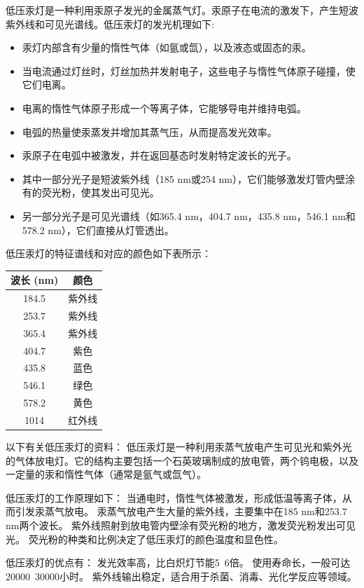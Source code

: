 \documentclass[dvipsnames, svgnames,a4paper,11pt]{article}
\begin{document}
	低压汞灯是一种利用汞原子发光的金属蒸气灯。汞原子在电流的激发下，产生短波紫外线和可见光谱线。低压汞灯的发光机理如下:
	
	\begin{itemize}
		\item 汞灯内部含有少量的惰性气体（如氩或氙），以及液态或固态的汞。
		\item 当电流通过灯丝时，灯丝加热并发射电子，这些电子与惰性气体原子碰撞，使它们电离。
		\item 电离的惰性气体原子形成一个等离子体，它能够导电并维持电弧。
		\item 电弧的热量使汞蒸发并增加其蒸气压，从而提高发光效率。
		\item 汞原子在电弧中被激发，并在返回基态时发射特定波长的光子。
		\item 其中一部分光子是短波紫外线（185 nm或254 nm），它们能够激发灯管内壁涂有的荧光粉，使其发出可见光。
		\item 另一部分光子是可见光谱线（如365.4 nm，404.7 nm，435.8 nm，546.1 nm和578.2 nm），它们直接从灯管透出。
	\end{itemize}
	
	低压汞灯的特征谱线和对应的颜色如下表所示：
	
	\begin{center}
		\begin{tabular}{|c|c|}
			\hline
			波长 (nm) & 颜色 \\
			\hline
			184.5 & 紫外线 \\
			253.7 & 紫外线 \\
			365.4 & 紫外线 \\
			404.7 & 紫色 \\
			435.8 & 蓝色 \\
			546.1 & 绿色 \\
			578.2 & 黄色 \\
			1014 & 红外线 \\
			\hline
		\end{tabular}
	\end{center}
	以下有关低压汞灯的资料：
	低压汞灯是一种利用汞蒸气放电产生可见光和紫外光的气体放电灯。它的结构主要包括一个石英玻璃制成的放电管，两个钨电极，以及一定量的汞和惰性气体（通常是氩气或氙气）。
	
	低压汞灯的工作原理如下：	
	当通电时，惰性气体被激发，形成低温等离子体，从而引发汞蒸气放电。
	汞蒸气放电产生大量的紫外线，主要集中在185 nm和253.7 nm两个波长。
	紫外线照射到放电管内壁涂有荧光粉的地方，激发荧光粉发出可见光。
	荧光粉的种类和比例决定了低压汞灯的颜色温度和显色性。
	
	低压汞灯的优点有：
	发光效率高，比白炽灯节能5~6倍。
	使用寿命长，一般可达20000~30000小时。
	紫外线输出稳定，适合用于杀菌、消毒、光化学反应等领域。
	
\end{document}
